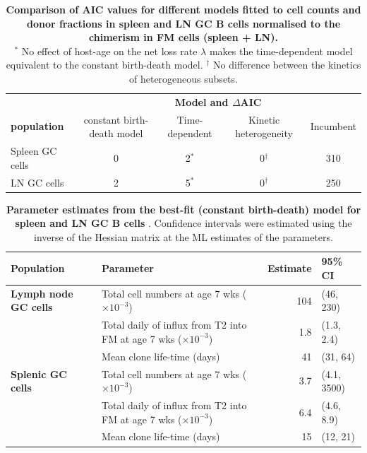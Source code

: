 \documentclass[11pt]{article}
\begin{document}
\begin{table}[h!]
	\begin{center}
		\renewcommand{\arraystretch}{1.25}
		\begin{tabular}{ l c c c c} 
			\toprule 
			& \multicolumn{4}{c}{\textbf{Model and $\Delta$AIC}} \\
			\cline{2-5}
			\textbf{population}  &  {\small constant birth-death model}  & {\small Time-dependent} &  {\small Kinetic heterogeneity} & {\small Incumbent}  \\ 
			\toprule
			Spleen GC cells     & 0      &  2$^{\ast}$  & 0$^{\dagger}$ & 310  \\ 
			LN GC cells         & 2      &  5$^{\ast}$  & 0$^{\dagger}$ & 250   \\ 
			\hline
			\toprule 
		\end{tabular}
	\end{center}
	\caption{\small \textbf{Comparison of AIC values for different models fitted to cell counts and donor fractions in spleen and LN GC B cells normalised to the chimerism in FM cells (spleen + LN).} \\
	$^{\ast}$ \footnotesize No effect of host-age on the net loss rate $\lambda$ makes the time-dependent model equivalent to the constant birth-death model.
	$^{\dagger}$ \footnotesize No difference between the kinetics of heterogeneous subsets.}
\label{tab:GC-AICs}
\end{table} 

\begin{table}[h!]
	\begin{center}
		\renewcommand{\arraystretch}{1.25}
		\begin{tabular}{l l r l } 
			\toprule 
			\textbf{Population} & \textbf{Parameter}  &  {\small Estimate}  &  {\small 95\% CI} \\ 
			\toprule
			\textbf{Lymph node GC cells} & Total cell numbers at age 7 wks ($\times 10^{-3}$)      & 104      &  (46, 230)  \\ 
			& Total daily of influx from T2 into FM at age 7 wks ($\times 10^{-3}$)           &   1.8    &  (1.3, 2.4)  \\
			& Mean clone life-time (days)      & 41     &  (31, 64)  \\ 
			\textbf{Splenic GC cells} & Total cell numbers at age 7 wks ($\times 10^{-3}$)      & 3.7      &  (4.1, 3500)  \\ 
			& Total daily of influx from T2 into FM at age 7 wks ($\times 10^{-3}$)           & 6.4      &  (4.6, 8.9)  \\
			& Mean clone life-time (days)      & 15     &  (12, 21)  \\ 
			\hline
			\toprule 
		\end{tabular}
	\end{center}
	\caption{\small \textbf{Parameter estimates from the best-fit (constant birth-death) model for spleen and LN GC B cells }.  Confidence intervals were estimated using the inverse of the Hessian matrix at the ML estimates of the parameters.}
	\label{tab:GC-parestm}
\end{table} 
\end{document}
